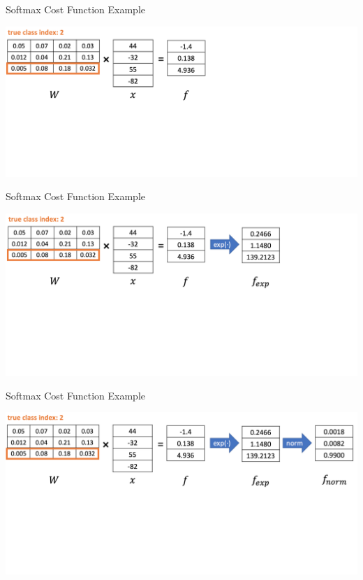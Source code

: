 \documentclass{beamer}
\begin{document}
\begin{frame}{Softmax Cost Function Example}
\begin{center}
\includegraphics[width=1.05\textwidth]{softmax_example3}
\end{center}
\end{frame}

\begin{frame}{Softmax Cost Function Example}
\begin{center}
\includegraphics[width=1.05\textwidth]{softmax_example4}
\end{center}
\end{frame}


\begin{frame}{Softmax Cost Function Example}
\begin{center}
\includegraphics[width=1.05\textwidth]{softmax_example5}
\end{center}
\end{frame}
\end{document}
